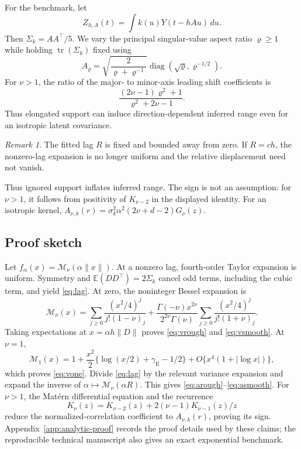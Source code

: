 \documentclass[sigconf]{acmart}
\theoremstyle{remark}
\newtheorem{remark}{Remark}
\newcommand{\Matern}{\mathcal M}
\newcommand{\E}{\mathbb E}
\newcommand{\tr}{\operatorname{tr}}
\begin{document}
For the benchmark, let
\[
Z_{h,A}(t)=\int k(u)Y(t-hAu)\,du.
\]
Then \(\Sigma_k=AA^\top/5\). We vary the principal singular-value aspect
ratio \(\varrho\geq1\) while holding \(\tr(\Sigma_k)\) fixed using
\begin{equation}
 A_\varrho=\sqrt{\frac{2}{\varrho+\varrho^{-1}}}
 \operatorname{diag}(\sqrt\varrho,\varrho^{-1/2}).
 \label{eq:transform}
\end{equation}
For \(\nu>1\), the ratio of the major- to minor-axis leading shift
coefficients is
\begin{equation}
 \frac{(2\nu-1)\varrho^2+1}{\varrho^2+2\nu-1}.
 \label{eq:aspectratio}
\end{equation}
Thus elongated support can induce direction-dependent inferred range even for
an isotropic latent covariance.

\begin{remark}
The fitted lag \(R\) is fixed and bounded away from zero. If \(R=ch\), the
nonzero-lag expansion is no longer uniform and the relative displacement need
not vanish.
\end{remark}

Thus ignored support inflates inferred range. The sign is not an assumption:
for \(\nu>1\), it follows from positivity of \(K_{\nu-2}\) in the displayed
identity. For an isotropic kernel,
\(A_{\nu,k}(r)=\sigma_k^2\alpha^2(2\nu+d-2)G_\nu(z)\).

\subsection{Proof sketch}

Let \(f_\alpha(x)=\Matern_\nu(\alpha\lVert x\rVert)\). At a nonzero lag,
fourth-order Taylor expansion is uniform. Symmetry and
\(\E(DD^\top)=2\Sigma_k\) cancel odd terms, including the cubic term, and yield
\eqref{eq:lag}. At zero,
the noninteger Bessel expansion is
\begin{equation}
\Matern_\nu(x)=
\sum_{j\geq0}\frac{(x^2/4)^j}{j!(1-\nu)_j}
+\frac{\Gamma(-\nu)x^{2\nu}}{2^{2\nu}\Gamma(\nu)}
\sum_{j\geq0}\frac{(x^2/4)^j}{j!(1+\nu)_j}.
\end{equation}
Taking expectations at \(x=\alpha h\lVert D\rVert\) proves
\eqref{eq:vrough} and \eqref{eq:vsmooth}. At \(\nu=1\),
\[
\Matern_1(x)=1+\frac{x^2}{2}
\{\log(x/2)+\gamma_{\mathrm E}-1/2\}
+O\{x^4(1+|\log x|)\},
\]
which proves \eqref{eq:vone}. Divide \eqref{eq:lag} by the relevant variance
expansion and expand the inverse of
\(\alpha\mapsto\Matern_\nu(\alpha R)\). This gives
\eqref{eq:arough}--\eqref{eq:asmooth}. For \(\nu>1\), the Matérn differential
equation and the recurrence
\[
K_\nu(z)=K_{\nu-2}(z)+2(\nu-1)K_{\nu-1}(z)/z
\]
reduce the normalized-correlation coefficient to \(A_{\nu,k}(r)\), proving its
sign. Appendix~\ref{app:analytic-proof} records the proof details used by these
claims; the reproducible technical manuscript also gives an exact exponential
benchmark.
\end{document}
